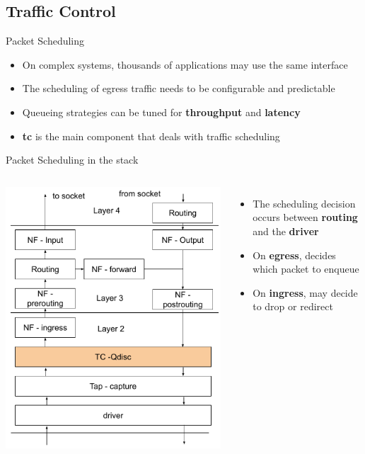 \subsection{Traffic Control}

\begin{frame}{Packet Scheduling}
	\begin{itemize}
		\item On complex systems, thousands of applications may use the same interface
		\item The scheduling of egress traffic needs to be configurable and predictable
		\item Queueing strategies can be tuned for \textbf{throughput} and \textbf{latency}
		\item \textbf{tc} is the main component that deals with traffic scheduling
	\end{itemize}
\end{frame}

\begin{frame}{Packet Scheduling in the stack}
	\begin{columns}
		\includegraphics[width=1\textwidth]{slides/networking-traffic-control/routing_tc.pdf}
		\begin{itemize}
			\item The scheduling decision occurs between \textbf{routing} and the \textbf{driver}
			\item On \textbf{egress}, decides which packet to enqueue
			\item On \textbf{ingress}, may decide to drop or redirect
		\end{itemize}
	\end{columns}
\end{frame}

